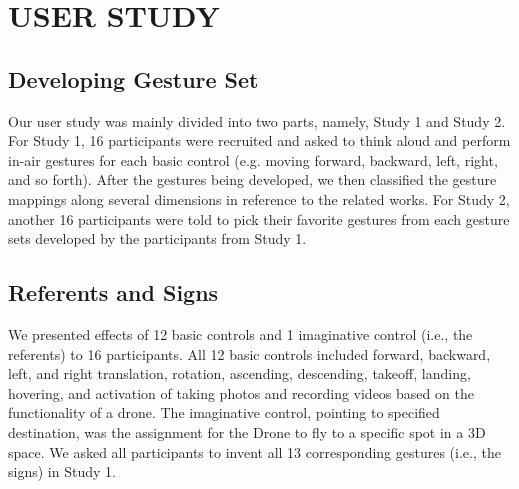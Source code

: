 \documentclass{sigchi}
\begin{document}


\section{USER STUDY}

\subsection{Developing Gesture Set}

Our user study was mainly divided into two parts, namely, Study 1 and Study 2. For Study 1, 16 participants were recruited and asked to think aloud and perform in-air gestures for each basic control (e.g. moving forward, backward, left, right, and so forth). After the gestures being developed, we then classified the gesture mappings along several dimensions in reference to the related works. For Study 2, another 16 participants were told to pick their favorite gestures from each gesture sets developed by the participants from Study 1.


\subsection{Referents and Signs}

We presented effects of 12 basic controls and 1 imaginative control (i.e., the referents) to 16 participants. All 12 basic controls included forward, backward, left, and right translation, rotation, ascending, descending, takeoff, landing, hovering, and activation of taking photos and recording videos based on the functionality of a drone. The imaginative control, pointing to specified destination, was the assignment for the Drone to fly to a specific spot in a 3D space. We asked all participants to invent all 13 corresponding gestures (i.e., the signs) in Study 1.
\end{document}

